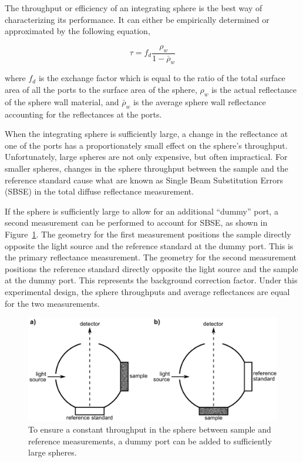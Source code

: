 The throughput or efficiency of an integrating sphere is the best way of characterizing its performance. It can either be empirically determined or approximated by the following equation,

\begin{equation}
\tau = f_d \frac{\rho_w}{1-\bar{\rho}_w}
\end{equation}

\noindent where $f_d$ is the exchange factor which is equal to the ratio of the total surface area of all the ports to the surface area of the sphere, $\rho_w$ is the actual reflectance of the sphere wall material, and $\bar{\rho}_w$ is the average sphere wall reflectance accounting for the reflectances at the ports.

When the integrating sphere is sufficiently large, a change in the reflectance at one of the ports has a proportionately small effect on the sphere's throughput. Unfortunately, large spheres are not only expensive, but often impractical. For smaller spheres, changes in the sphere throughput between the sample and the reference standard cause what are known as Single Beam Substitution Errors (SBSE) in the total diffuse reflectance measurement.

If the sphere is sufficiently large to allow for an additional ``dummy'' port, a second measurement can be performed to account for SBSE, as shown in Figure~\ref{fig:intro-is_compar}.\cite{Labspherec} The geometry for the first measurement positions the sample directly opposite the light source and the reference standard at the dummy port. This is the primary reflectance measurement. The geometry for the second measurement positions the reference standard directly opposite the light source and the sample at the dummy port. This represents the background correction factor. Under this experimental design, the sphere throughputs and average reflectances are equal for the two measurements.

\begin{figure}
	\centering \includegraphics[width=1.0\textwidth]{figures/intro-is_compar.png}
	\caption[The comparison method for measuring sample reflectance]{\label{fig:intro-is_compar}To ensure a constant throughput in the sphere between sample and reference measurements, a dummy port can be added to sufficiently large spheres.}
\end{figure}


